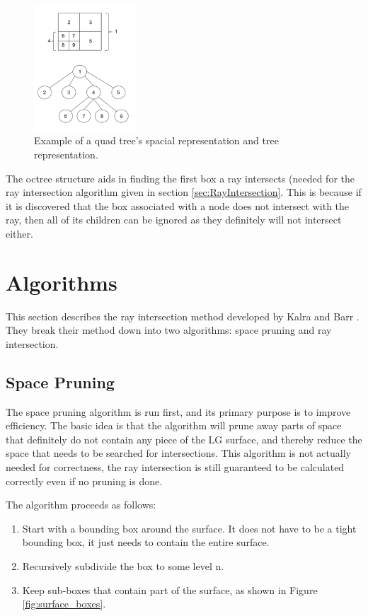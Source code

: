 \documentclass[conference]{acmsiggraph}
\begin{document}
\begin{figure}[ht]
  \centering
  \includegraphics[width=1.5in]{figures/quadtree.png}
  \caption{Example of a quad tree's spacial representation and tree representation.}
  \label{fig:quadtree}
\end{figure}

The octree structure aids in finding the first box a ray intersects (needed 
for the ray intersection algorithm given in section \ref{sec:RayIntersection}.
This is because if it is discovered that the box associated with a node does not
intersect with the ray, then all of its children can be ignored as they
definitely will not intersect either.

\section{Algorithms}
\label{sec:Algorithms}

This section describes the ray intersection method developed by
Kalra and Barr \cite{KalraBarr1989}.  They break their method down into
two algorithms: space pruning and ray intersection.

\subsection{Space Pruning}
\label{sec:SpacePruning}

The space pruning algorithm is run first, and its primary purpose is to
improve efficiency.  The basic idea is that the algorithm will prune 
away parts of space that definitely do not contain any piece of the LG
surface, and thereby reduce the space that needs to be searched for 
intersections.  This algorithm is not actually needed for correctness,
the ray intersection is still guaranteed to be calculated correctly
even if no pruning is done.

The algorithm proceeds as follows:
\begin{enumerate}
	\item Start with a bounding box around the surface.  It does not
	have to be a tight bounding box, it just needs to contain the
	entire surface.
	\item Recursively subdivide the box to some level n.
	\item Keep sub-boxes that contain part of the surface, as shown
	in Figure \ref{fig:surface_boxes}.
\end{enumerate}
\end{document}
